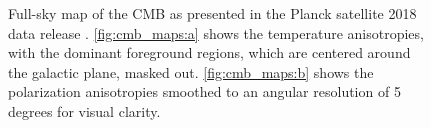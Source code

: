 \begin{figure}[!ht]
    \centering
    \hfill
    \caption[Planck full-sky CMB temperature and polarization maps (2018)]{Full-sky map of the CMB as presented in the Planck satellite 2018 data release \cite{planck_collaboration_planck_2019}. \ref{fig:cmb_maps:a} shows the temperature anisotropies, with the dominant foreground regions, which are centered around the galactic plane, masked out. \ref{fig:cmb_maps:b} shows the polarization anisotropies smoothed to an angular resolution of 5 degrees for visual clarity.}
    \label{fig:cmb_maps}
\end{figure}

